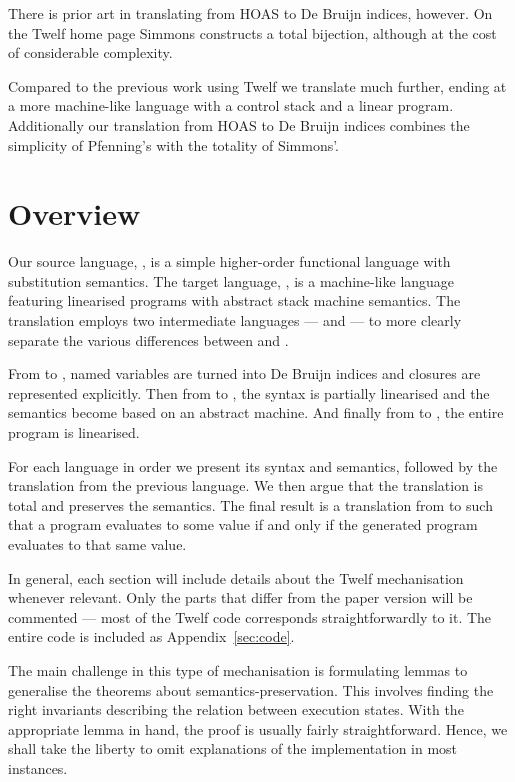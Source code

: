 There is prior art in translating from HOAS to De Bruijn indices, however.
On the Twelf home page Simmons \cite{Simmons07} constructs a total bijection, although at the cost of considerable complexity.

Compared to the previous work using Twelf we translate much further, ending at a more machine-like language with a control stack and a linear program.
Additionally our translation from HOAS to De Bruijn indices combines the simplicity of Pfenning's with the totality of Simmons'.


\section{Overview}

Our source language, \hlang, is a simple higher-order functional language with substitution semantics.
The target language, \mlang, is a machine-like language featuring linearised programs with abstract stack machine semantics.
The translation employs two intermediate languages --- \blang and \slang --- to more clearly separate the various differences between \hlang and \mlang.

From \hlang to \blang, named variables are turned into De Bruijn indices and closures are represented explicitly.
Then from \blang to \slang, the syntax is partially linearised and the semantics become based on an abstract machine.
And finally from \slang to \mlang, the entire program is linearised.

For each language in order we present its syntax and semantics, followed by the translation from the previous language.
We then argue that the translation is total and preserves the semantics.
The final result is a translation from \hlang to \mlang such that a \hlang program evaluates to some value if and only if the generated \mlang program evaluates to that same value.

In general, each section will include details about the Twelf mechanisation whenever relevant.
Only the parts that differ from the paper version will be commented --- most of the Twelf code corresponds straightforwardly to it.
The entire code is included as Appendix~\ref{sec:code}.

The main challenge in this type of mechanisation is formulating lemmas to generalise the theorems about semantics-preservation.
This involves finding the right invariants describing the relation between execution states.
With the appropriate lemma in hand, the proof is usually fairly straightforward.
Hence, we shall take the liberty to omit explanations of the implementation in most instances.
